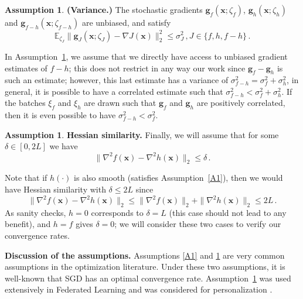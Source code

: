 \documentclass[10pt]{article} %
\theoremstyle{plain}
\theoremstyle{definition}
\newtheorem{assumption}[theorem]{Assumption}
\theoremstyle{remark}
\newcommand{\norm}[1]{\|#1\|_2}
\def\vg{{\bm{g}}}
\def\vx{{\bm{x}}}
\newcommand{\E}{\mathbb{E}}
\begin{document}
\begin{assumption}\label{A2}
\textbf{(Variance.)} The stochastic gradients $\vg_f(\vx; \zeta_f)$, $\vg_h(\vx; \zeta_h)$ and $\vg_{f-h}(\vx; \zeta_{f-h})$ are unbiased, and satisfy
    \begin{equation*}\label{eqn:variance}
        \E_{\zeta_J}\norm{\vg_J(\vx; \zeta_J) - \nabla J(\vx)}^2 \leq \sigma_J^2 \,, J\in\{f,h,f-h\}\,.
    \end{equation*}
\end{assumption}

In Assumption~\ref{A2}, we assume that we directly have access to unbiased gradient estimates of $f-h$; this does not restrict in any way our work since $\vg_f - \vg_h$ is such an estimate; however, this last estimate has a variance of $\sigma_{f-h}^2 = \sigma_f^2 + \sigma_h^2$, in general, it is possible to have a correlated estimate such that $\sigma_{f-h}^2<\sigma_f^2 + \sigma_h^2$. If the batches $\xi_f$ and $\xi_h$ are drawn such that $\vg_f$ and $\vg_h$ are positively correlated, then it is even possible to have $\sigma_{f-h}^2<\sigma_f^2$.

\begin{assumption}\label{A3}
\textbf{Hessian similarity.} Finally, we will assume that for some $\delta \in [0,2L]$ we have
    \begin{equation*}\label{eqn:hessian-sim}
        \norm{\nabla^2 f(\vx) - \nabla^2 h(\vx)} \leq \delta \,.
    \end{equation*}    
\end{assumption} Note that if $h(\cdot)$ is also smooth (satisfies Assumption~\ref{A1}), then we would have Hessian similarity with $\delta \leq 2L$ since
    \[
        \norm{\nabla^2 f(\vx) - \nabla^2 h(\vx)} \leq \norm{\nabla^2 f(\vx)} + \norm{\nabla^2 h(\vx)}  \leq 2L\,.
    \]%
As sanity checks, $h=0$ corresponds to $\delta = L$ (this case should not lead to any benefit), and $h=f$ gives $\delta=0$; we will consider these two cases to verify our convergence rates.

\textbf{Discussion of the assumptions.} Assumptions \ref{A1} and \ref{A2} are very common assumptions in the optimization literature. Under these two assumptions, it is well-known that SGD \citep{SGd51, SGD52} has an optimal convergence rate. Assumption~\ref{A3} was used extensively in Federated Learning \citep{MiMe,karimireddy2019scaffold} and was considered for personalization \citep{LinSpeedup}.
\end{document}
